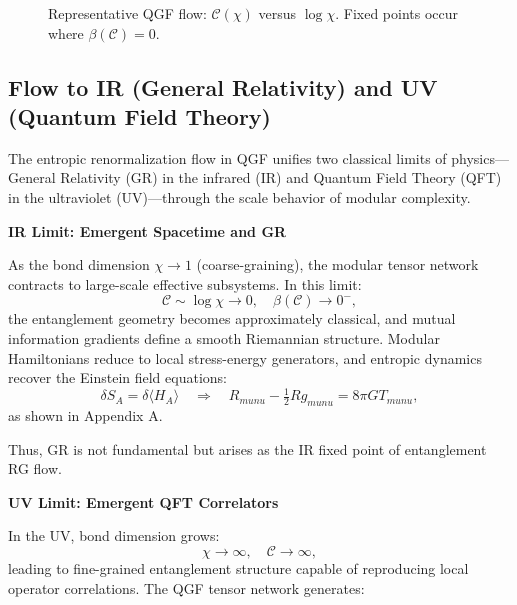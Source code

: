 \documentclass[11pt]{article}
\def\mu{mu}
\def\nu{nu}
\begin{document}
\begin{figure}[H]
\centering
{}
\caption{Representative QGF flow: \( \mathcal{C}(\chi) \) versus \( \log \chi \). Fixed points occur where \( \beta(\mathcal{C}) = 0 \).}
\label{fig:entropic-flow}
\end{figure}



\subsection{Flow to IR (General Relativity) and UV (Quantum Field Theory)}

The entropic renormalization flow in QGF unifies two classical limits of physics—General Relativity (GR) in the infrared (IR) and Quantum Field Theory (QFT) in the ultraviolet (UV)—through the scale behavior of modular complexity.

\vspace{0.5em}
\noindent\textbf{IR Limit: Emergent Spacetime and GR}

As the bond dimension \( \chi \rightarrow 1 \) (coarse-graining), the modular tensor network contracts to large-scale effective subsystems. In this limit:
\[
\mathcal{C} \sim \log \chi \rightarrow 0, \quad \beta(\mathcal{C}) \rightarrow 0^{-},
\]
the entanglement geometry becomes approximately classical, and mutual information gradients define a smooth Riemannian structure. Modular Hamiltonians reduce to local stress-energy generators, and entropic dynamics recover the Einstein field equations:
\[
\delta S_A = \delta \langle H_A \rangle \quad \Rightarrow \quad R_{\mu\nu} - \tfrac{1}{2} R g_{\mu\nu} = 8\pi G T_{\mu\nu},
\]
as shown in Appendix A.

Thus, GR is not fundamental but arises as the IR fixed point of entanglement RG flow.

\vspace{0.5em}
\noindent\textbf{UV Limit: Emergent QFT Correlators}

In the UV, bond dimension grows:
\[
\chi \rightarrow \infty, \quad \mathcal{C} \rightarrow \infty,
\]
leading to fine-grained entanglement structure capable of reproducing local operator correlations. The QGF tensor network generates:
\end{document}
